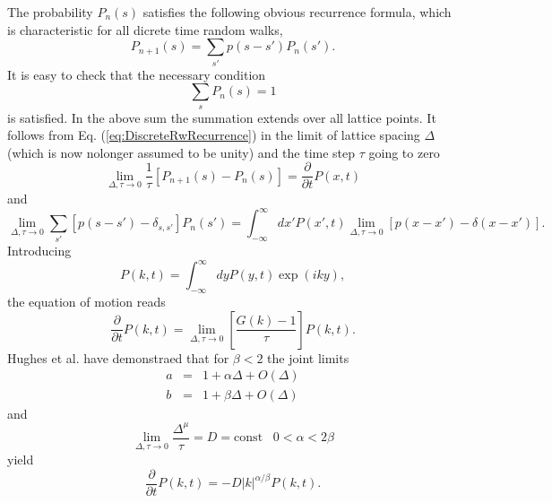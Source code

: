 The probability $P_n(s)$ satisfies the following obvious recurrence formula,
which is characteristic for all dicrete time random walks,
\begin{equation}
\label{eq:DiscreteRwRecurrence}
  P_{n+1}(s) = \sum_{s'} p(s-s') P_n(s').
\end{equation}
It is easy to check that the necessary condition
\begin{displaymath}
  \sum_{s} P_n(s) =1
\end{displaymath}
is satisfied. In the above sum the summation extends over all lattice points.
It follows from Eq. (\ref{eq:DiscreteRwRecurrence}) in the limit of lattice
spacing $\Delta$ (which is now nolonger assumed to be unity) and the time step
$\tau$ going to zero 
\begin{displaymath}
  \lim_{\Delta, \tau \rightarrow 0} \frac{1}{\tau} 
           \left[ P_{n+1}(s) - P_n(s) \right] =
          \frac{\partial}{\partial t} P(x,t)
\end{displaymath}
and
\begin{displaymath}
\lim_{\Delta, \tau \rightarrow 0} \sum_{s'}
      \left[ p(s-s') - \delta_{s,s'}  \right] P_n(s') =
     \int_{-\infty}^{\infty} dx'P(x',t) \lim_{\Delta, \tau \rightarrow 0}
         \left[ p(x-x') - \delta(x-x') \right].   
\end{displaymath}
Introducing
\begin{displaymath}
  P(k,t) = \int_{-\infty}^{\infty} dy P(y,t) \exp(iky),
\end{displaymath}
the equation of motion reads
\begin{displaymath}
  \frac{\partial}{\partial t} P(k,t) = \lim_{\Delta, \tau \rightarrow 0} 
       \left[ \frac{G(k) -1 }{\tau}\right] P(k,t).
\end{displaymath}
Hughes et al. \cite{} have demonstraed that for $\beta <2$ the joint limits
\begin{eqnarray*}
  a & = & 1 + \alpha \Delta + O(\Delta) \\
  b & = & 1 + \beta \Delta + O(\Delta)
\end{eqnarray*}
and
\begin{displaymath}
  \lim_{\Delta, \tau \rightarrow 0} \frac{\Delta^{\mu}}{\tau} = D 
      = \mbox{const} \;\;\; 0 < \alpha  < 2 \beta
\end{displaymath}
yield
\begin{equation}
\label{eq:WeierstrassMasterF}
  \frac{\partial}{\partial t} P(k,t) = - D |k|^{\alpha/\beta} P(k,t).
\end{equation}
